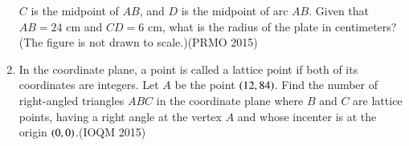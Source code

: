 \begin{enumerate}[label=\thesubsection.\arabic*,ref=\thesubsection.\theenumi]
    $ C $ is the midpoint of $ AB $, and $ D $ is the midpoint of arc $ AB $. Given that $ AB = 24 $ cm and $ CD = 6 $ cm, what is the radius of the plate in centimeters? (The figure is not drawn to scale.)\hfill(PRMO 2015)
    \item In the coordinate plane, a point is called a lattice point if both of its coordinates are integers. Let $A$ be the point $\left(12, 84\right)$. Find the number of right-angled triangles $ABC$ in the coordinate plane where $B$ and $C$ are lattice points, having a right angle at the vertex $A$ and whose incenter is at the origin $\left(0, 0\right)$.\hfill(IOQM 2015)
\end{enumerate}
